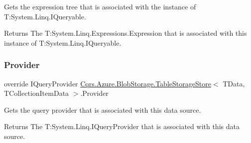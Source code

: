 Gets the expression tree that is associated with the instance of T\+:\+System.\+Linq.\+I\+Queryable. 

\begin{DoxyReturn}{Returns}
The T\+:\+System.\+Linq.\+Expressions.\+Expression that is associated with this instance of T\+:\+System.\+Linq.\+I\+Queryable. 
\end{DoxyReturn}
\mbox{\label{classCqrs_1_1Azure_1_1BlobStorage_1_1TableStorageStore_a95c1b0fce651992dd6bd75f44da15829_a95c1b0fce651992dd6bd75f44da15829}} 
\subsubsection{\texorpdfstring{Provider}{Provider}}
{\footnotesize\ttfamily override I\+Query\+Provider \hyperlink{classCqrs_1_1Azure_1_1BlobStorage_1_1TableStorageStore}{Cqrs.\+Azure.\+Blob\+Storage.\+Table\+Storage\+Store}$<$ T\+Data, T\+Collection\+Item\+Data $>$.Provider\hspace{0.3cm}{\ttfamily [get]}}



Gets the query provider that is associated with this data source. 

\begin{DoxyReturn}{Returns}
The T\+:\+System.\+Linq.\+I\+Query\+Provider that is associated with this data source. 
\end{DoxyReturn}
